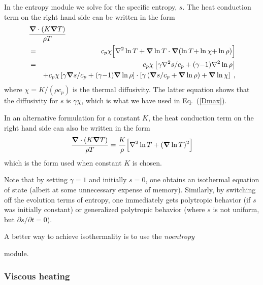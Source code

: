 \documentclass[\mydriver,12pt,twoside,notitlepage,a4paper]{article}
\makeatletter
\newcommand{\name}[2][]{%
  \def\index@{#1}%
  \textsl{#2\/}%
  \ifx\index@\@empty\index{#2@\MakeUppercase #2}%
  \else\index{#1}%
  \fi%
}
\renewcommand{\vec}[1]{\mbox{\boldmath{$#1$}}}
\newcommand{\grad}    {\vec{\nabla}}
\newcommand{\Div}     {\vec{\nabla}\cdot}
\newcommand{\Laplace} {\nabla^2}
\makeatother
\begin{document}
In the entropy module we solve for the specific entropy, $s$.
The heat conduction term on the right hand side can be written in the form
\begin{eqnarray}
\lefteqn{\frac{\Div(K\grad T)}
              {\rho T}} \\
%
  &=&
  c_p\chi\Bigl[
        \Laplace\ln T
        + \grad\ln T \cdot \grad(\ln T{+}\ln\chi{+}\ln\rho)
      \Bigr] \\
%
  &=&
  c_p\chi \left[ \gamma\Laplace s/c_p + (\gamma{-}1)\Laplace\ln\rho \right] \nonumber\\
  & &   + c_p\chi \left[ \gamma\grad s/c_p
                      + (\gamma{-}1)\grad\ln\rho \right]
          \cdot\left[ \gamma\left(\grad s/c_p + \grad\ln\rho\right)
                      + \grad\ln\chi \right] \; ,
\end{eqnarray}
where $\chi = K/(\rho c_p)$ is the thermal diffusivity.
The latter equation shows that the diffusivity for $s$ is $\gamma\chi$,
which is what we have used in Eq.~(\ref{Dmax}).

In an alternative formulation for a constant $K$, the heat conduction
term on the right hand side can also be written in the form
\begin{eqnarray}
\frac{\Div(K\grad T)}
              {\rho T} =
  \frac{K}{\rho}\Bigl[ \Laplace\ln T + (\grad \ln T)^2 \Bigr]
\end{eqnarray}
which is the form used when constant $K$ is chosen.
\bigskip

Note that by setting $\gamma=1$ and initially $s=0$, one obtains an
isothermal equation of state (albeit at some unnecessary expense of
memory).
Similarly, by switching off the evolution terms of entropy, one immediately
gets polytropic behavior (if $s$ was initially constant) or generalized
polytropic behavior
(where $s$ is not uniform, but $\partial s/\partial t = 0$).

A better way to achieve isothermality is to use the \name{noentropy}
module.

\subsubsection{Viscous heating}
\end{document}
